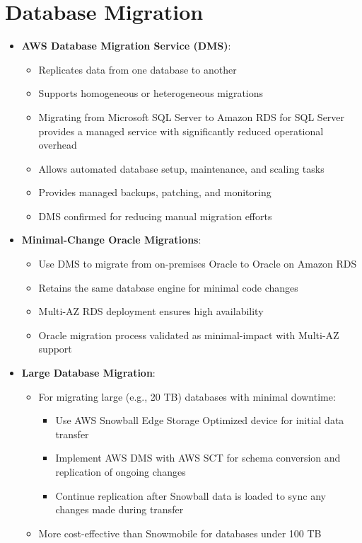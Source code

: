 \documentclass[11pt,a4paper]{report}
\begin{document}
\section{Database Migration}

\begin{itemize}
  \item \textbf{AWS Database Migration Service (DMS)}:
\begin{itemize}
  \item Replicates data from one database to another
  \item Supports homogeneous or heterogeneous migrations
  \item Migrating from Microsoft SQL Server to Amazon RDS for SQL Server provides a managed service with significantly reduced operational overhead
  \item Allows automated database setup, maintenance, and scaling tasks
  \item Provides managed backups, patching, and monitoring
  \item DMS confirmed for reducing manual migration efforts
\end{itemize}
  \item \textbf{Minimal-Change Oracle Migrations}:
\begin{itemize}
  \item Use DMS to migrate from on-premises Oracle to Oracle on Amazon RDS
  \item Retains the same database engine for minimal code changes
  \item Multi-AZ RDS deployment ensures high availability
  \item Oracle migration process validated as minimal-impact with Multi-AZ support
\end{itemize}
  \item \textbf{Large Database Migration}:
\begin{itemize}
  \item For migrating large (e.g., 20 TB) databases with minimal downtime:
\begin{itemize}
  \item Use AWS Snowball Edge Storage Optimized device for initial data transfer
  \item Implement AWS DMS with AWS SCT for schema conversion and replication of ongoing changes
  \item Continue replication after Snowball data is loaded to sync any changes made during transfer
\end{itemize}
  \item More cost-effective than Snowmobile for databases under 100 TB

\end{itemize}
\end{itemize}
\end{document}
